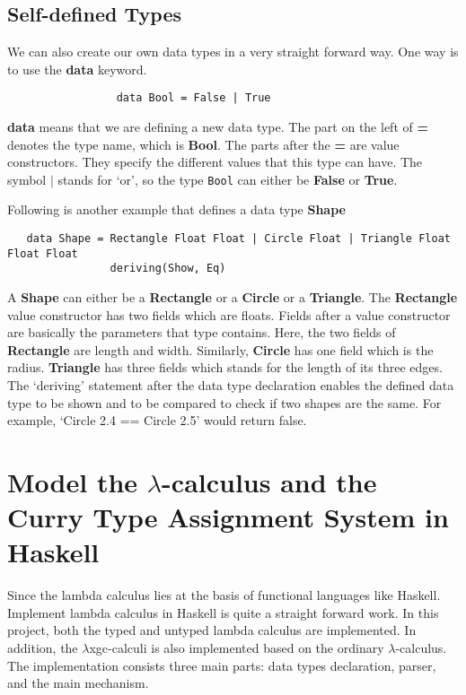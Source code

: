 \subsection{Self-defined Types}

We can also create our own data types in a very straight forward way. One way is to use the \textbf{data} keyword.

\begin{verbatim}
                 data Bool = False | True
\end{verbatim} 

\textbf{data} means that we are defining a new data type. The part on the left of \textbf{=} denotes the type name, which is \textbf{Bool}. The parts after the \textbf{=} are value constructors. They specify the different values that this type can have. The symbol $|$ stands for `or', so the type \verb|Bool| can either be \textbf{False} or \textbf{True}. 

Following is another example that defines a data type \textbf{Shape}

\begin{verbatim}
   data Shape = Rectangle Float Float | Circle Float | Triangle Float Float Float
                deriving(Show, Eq)  
\end{verbatim}

A \textbf{Shape} can either be a \textbf{Rectangle} or a \textbf{Circle} or a \textbf{Triangle}. The \textbf{Rectangle} value constructor has two fields which are floats. Fields after a value constructor are basically the parameters that type contains. Here, the two fields of \textbf{Rectangle} are length and width. Similarly, \textbf{Circle} has one field which is the radius. \textbf{Triangle} has three fields which stands for the length of its three edges. The `deriving' statement after the data type declaration enables the defined data type to be shown and to be compared to check if two shapes are the same. For example, `Circle 2.4 == Circle 2.5' would return false. 

\section{Model the $\lambda$-calculus and the Curry Type Assignment System in Haskell}

Since the lambda calculus lies at the basis of functional languages like Haskell. Implement lambda calculus in Haskell is quite a straight forward work. In this project, both the typed and untyped lambda calculus are implemented. In addition, the $\lambda$xgc-calculi is also implemented based on the ordinary $\lambda$-calculus. The implementation consists three main parts: data types declaration, parser, and the main mechanism.

